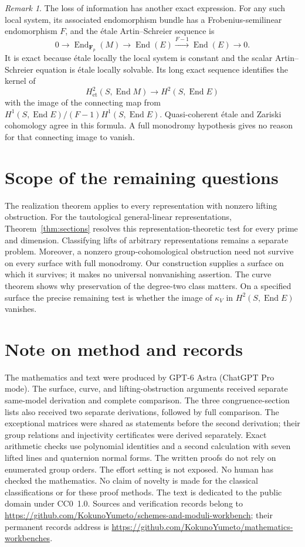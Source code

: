 \documentclass[11pt]{article}
\newcommand{\workbenchurl}{https://github.com/KokunoYumeto/schemes-and-moduli-workbench}
\newcommand{\recordurl}{https://github.com/KokunoYumeto/mathematics-workbenches}
\newcommand{\Fp}{\mathbf F_p}\newcommand{\OO}{\mathcal O}
\DeclareMathOperator{\End}{End}\DeclareMathOperator{\Hom}{Hom}
\theoremstyle{definition}\newtheorem{definition}[theorem]{Definition}
\theoremstyle{remark}\newtheorem{remark}[theorem]{Remark}
\begin{document}
\begin{remark}\label{rem:as}
The loss of information has another exact expression. For any such local system, its associated endomorphism bundle has a Frobenius-semilinear endomorphism $F$, and the \'etale Artin--Schreier sequence is
\[
 0\longrightarrow\End_{\Fp}(M)\longrightarrow\End(E)
       \xrightarrow{F-1}\End(E)\longrightarrow0.
\]
It is exact because \'etale locally the local system is constant and the scalar Artin--Schreier equation is \'etale locally solvable. Its long exact sequence identifies the kernel of
\[
 H^2_{\mathrm{et}}(S,\End M)\longrightarrow H^2(S,\End E)
\]
with the image of the connecting map from
$H^1(S,\End E)/(F-1)H^1(S,\End E)$. Quasi-coherent \'etale and Zariski cohomology agree in this formula. A full monodromy hypothesis gives no reason for that connecting image to vanish.
\end{remark}

\section{Scope of the remaining questions}

The realization theorem applies to every representation with nonzero lifting obstruction. For the tautological general-linear representations, Theorem~\ref{thm:sections} resolves this representation-theoretic test for every prime and dimension. Classifying lifts of arbitrary representations remains a separate problem. Moreover, a nonzero group-cohomological obstruction need not survive on every surface with full monodromy. Our construction supplies a surface on which it survives; it makes no universal nonvanishing assertion. The curve theorem shows why preservation of the degree-two class matters. On a specified surface the precise remaining test is whether the image of $\kappa_V$ in $H^2(S,\End E)$ vanishes.

\section*{Note on method and records}

The mathematics and text were produced by GPT-6 Astra (ChatGPT Pro mode). The surface, curve, and lifting-obstruction arguments received separate same-model derivation and complete comparison. The three congruence-section lists also received two separate derivations, followed by full comparison. The exceptional matrices were shared as statements before the second derivation; their group relations and injectivity certificates were derived separately. Exact arithmetic checks use polynomial identities and a second calculation with seven lifted lines and quaternion normal forms. The written proofs do not rely on enumerated group orders. The effort setting is not exposed. No human has checked the mathematics. No claim of novelty is made for the classical classifications or for these proof methods. The text is dedicated to the public domain under CC0~1.0. Sources and verification records belong to \url{\workbenchurl}; their permanent records address is \url{\recordurl}.
\end{document}
